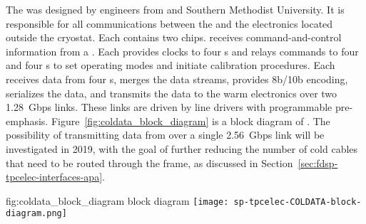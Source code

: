 The   was designed by engineers from  
and Southern Methodist University. It is responsible for all communications 
between the  and the electronics located outside the cryostat. 
Each  contains two  chips.  receives 
command-and-control information from a . Each  provides 
clocks to four s and relays commands to four  
  and four s to set operating modes and 
initiate calibration procedures.  Each  receives data from four 
s, merges the data streams, provides 8b/10b encoding, serializes 
the data, and transmits the data to the warm electronics over two \SI{1.28}{Gbps} 
links.  These links are driven by line drivers with programmable pre-emphasis. 
Figure~\ref{fig:coldata_block_diagram} is a block diagram of . 
The possibility of transmitting data from  over a single 
\SI{2.56}{Gbps} link will be investigated in 2019, with the goal of further
reducing the number of cold cables that need to be routed through the
 frame, as discussed in Section~\ref{sec:fdsp-tpcelec-interfaces-apa}.

\begin{dunefigure}
{fig:coldata_block_diagram}
{ block diagram}
\texttt{[image: sp-tpcelec-COLDATA-block-diagram.png]}
\end{dunefigure}

